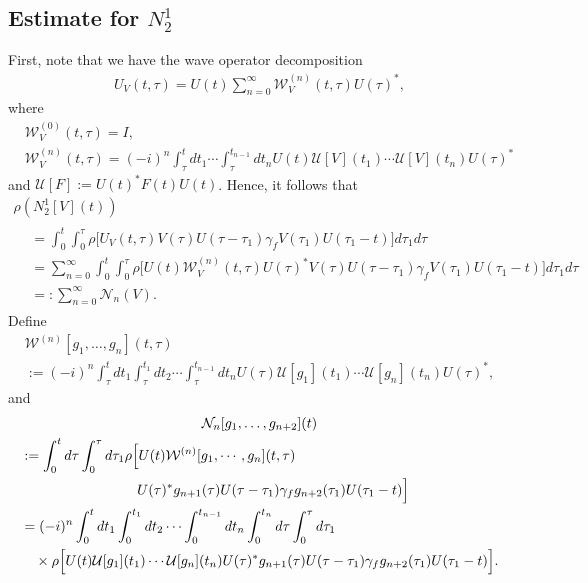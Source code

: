 \documentclass[AHL,Unicode,longabstracts,MathTools,published]{cedram}
\newcommand{\CN}{\mathcal{N}}
\newcommand{\CU}{\mathcal{U}}
\newcommand{\CW}{\mathcal{W}}
\newcommand{\ga}{\gamma}
\newcommand{\ta}{\tau}
\newcommand{\rh}{\rho}
\newcommand{\I}{\infty}
\begin{document}
\subsection{Estimate for \texorpdfstring{$N_2^1$}{N21}} 

First, note that we have the wave operator decomposition
\begin{align}\label{eq:wave expansion}
U_V(t,\ta) = U(t) \sum_{n=0}^\I \CW_V^{(n)}(t,\ta) U(\ta)^*,
\end{align}
where
\begin{align}
&\CW_V^{(0)}(t,\ta) = I, \\
&\CW_V^{(n)}(t,\ta) = (-i)^n \int_{\ta}^t dt_1 \cdots \int_{\ta}^{t_{n-1}} dt_n U(t) \CU[V](t_1) \cdots \CU[V](t_n) U(\ta)^*
\end{align}
and $\CU[F]:= U(t)^* F(t) U(t)$. Hence, it follows that
\begin{multline}
\rh\left(N_2^1[V](t)\right) \\
\begin{aligned}
&= \int_0^t \int_0^\ta \rh\big[U_V(t,\ta)V(\ta)U(\ta-\ta_1) \ga_f V(\ta_1) U(\ta_1-t)\big] d\ta_1 d\ta \\
&= \sum_{n=0}^\I \int_0^t \int_0^\ta
\rh \Big[U(t) \CW_V^{(n)}(t,\ta) U(\ta)^* V(\ta)U(\ta-\ta_1) \ga_f V(\ta_1) U(\ta_1-t) \Big] d\ta_1 d\ta \\
&=: \sum_{n=0}^\I \CN_n(V).
\end{aligned}
\end{multline}
Define
\begin{multline}
\CW^{(n)}[g_1,\dots,g_n](t,\ta)\\
 := (-i)^n \int_{\ta}^t dt_1 \int_{\ta}^{t_1} dt_2 \cdots \int_{\ta}^{t_{n-1}} dt_n U(\ta) \CU[g_1](t_1) \cdots \CU[g_n](t_n) U(\ta)^*,
\end{multline}
and
\begin{multline}
\CN_n[g_1, \dots, g_{n+2}](t) \\
\begin{aligned}
&:= \int_0^t d\ta \int_0^\ta d\ta_1
\rh \Big[U(t) \CW^{(n)}[g_1,\cdots,g_n](t,\ta)\\ &\mkern150mu U(\ta)^* g_{n+1}(\ta)U(\ta-\ta_1)
\ga_f g_{n+2}(\ta_1) U(\ta_1-t) \Big] \\
& = (-i)^{n} \int_0^t dt_1 \int_0^{t_1}dt_2 \cdots \int_0^{t_{n-1}} dt_n \int_0^{t_n} d\ta \int_0^\ta d\ta_1 \\
&\quad \times \rh \Big[U(t) \CU[g_1](t_1) \cdots \CU[g_n](t_n) U(\ta)^* g_{n+1}(\ta) U(\ta-\ta_1)\ga_f g_{n+2}(\ta_1) U(\ta_1-t) \Big].
\end{aligned}
\end{multline}
\end{document}
